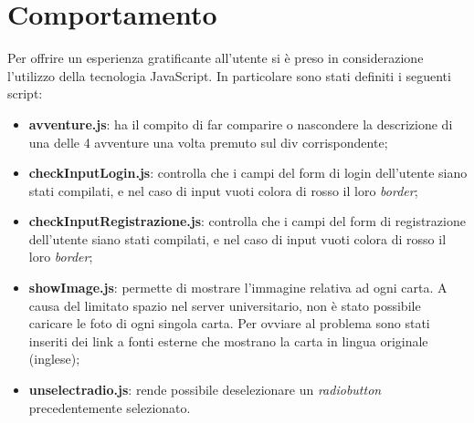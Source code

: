 \section{Comportamento}
Per offrire un esperienza gratificante all'utente si è preso in considerazione l'utilizzo della tecnologia JavaScript. In particolare sono stati definiti i seguenti script:\\
\begin{itemize}
	\item \textbf{avventure.js}: ha il compito di far comparire o nascondere la descrizione di una delle 4 avventure una volta premuto sul div corrispondente;
	\item \textbf{checkInputLogin.js}: controlla che i campi del form di login dell'utente siano stati compilati, e nel caso di input vuoti colora di rosso il loro \textit{border};
	\item \textbf{checkInputRegistrazione.js}: controlla che i campi del form di registrazione dell'utente siano stati compilati, e nel caso di input vuoti colora di rosso il loro \textit{border};
	\item \textbf{showImage.js}: permette di mostrare l'immagine relativa ad ogni carta.  A causa del limitato spazio nel server universitario, non è stato possibile caricare le foto di ogni singola carta. Per ovviare al problema sono stati inseriti dei link a fonti esterne che mostrano la carta in lingua originale (inglese);
	\item \textbf{unselectradio.js}: rende possibile deselezionare un \textit{radiobutton} precedentemente selezionato.
\end{itemize}


\newpage